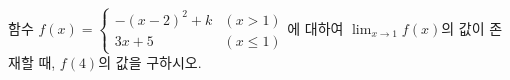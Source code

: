함수 $f(x)=\begin{cases} -(x-2)^2+k & (x>1) \\ 3x+5 & (x\le 1) \end{cases}$에 대하여 $\displaystyle\lim_{x\to 1} f(x)$의 값이 존재할 때, $f(4)$의 값을 구하시오. 

